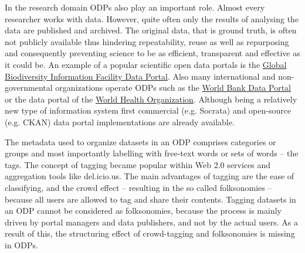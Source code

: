 In the research domain ODPs also play an important role.
Almost every researcher works with data. 
However, quite often only the results of analysing the data are published and archived. 
The original data, that is ground truth, is often not publicly available thus hindering repeatability, reuse as well as repurposing and consequently preventing science to be as efficient, transparent and effective as it could be. 
An example of a popular scientific open data portals is the \href{http://data.gbif.org}{Global Biodiversity Information Facility Data Portal}.
Also many international and non-governmental organizations operate ODPs such as the \href{http://data.worldbank.org}{World Bank Data Portal} or the data portal of the \href{http://apps.who.int/gho/data/}{World Health Organization}.
Although being a relatively new type of information system first commercial (e.g. Socrata) and open-source (e.g. CKAN) data portal implementations are already available.



The metadata used to organize datasets in an ODP comprises categories or groups and most importantly labelling with free-text words or sets of words -- the tags.
The concept of tagging became popular within Web 2.0 services and aggregation tools like del.icio.us. 
The main advantages of tagging are the ease of classifying, and the crowd effect -- resulting in the so called folksonomies -- because all users are allowed to tag and share their contents. 
Tagging datasets in an ODP cannot be considered as folksonomies, because the process is mainly driven by portal managers and data publishers, and not by the actual users.
As a result of this, the structuring effect of crowd-tagging and folksonomies is missing in ODPs.

